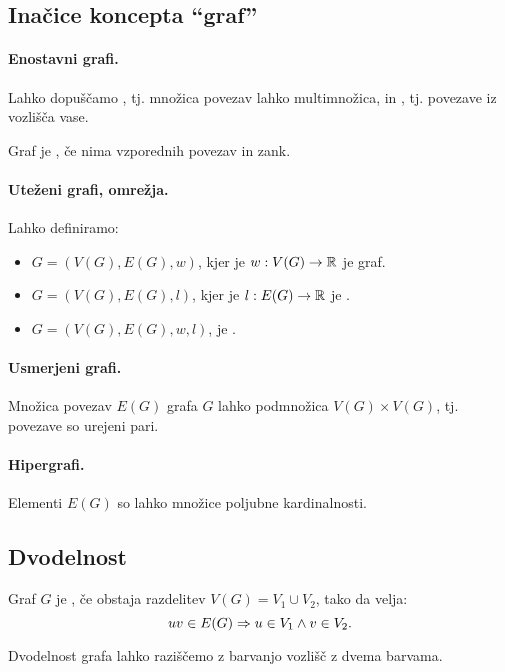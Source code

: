\subsection{Inačice koncepta "`graf"'}
\paragraph{Enostavni grafi.} Lahko dopuščamo , tj. množica povezav lahko multimnožica, in , tj. povezave iz vozlišča vase.
\begin{definicija}
    Graf je , če nima vzporednih povezav in zank.
\end{definicija}

\paragraph{Uteženi grafi, omrežja.} Lahko definiramo:
\begin{itemize}
    \item $G = (V(G), E(G), w)$, kjer je $w: V(G) \to \mathbb{R}$ je  graf.
    \item $G = (V(G), E(G), l)$, kjer je $l: E(G) \to \mathbb{R}$ je .
    \item $G = (V(G), E(G), w, l)$, je . 
\end{itemize}

\paragraph{Usmerjeni grafi.} Množica povezav $E(G)$ grafa $G$ lahko podmnožica $V(G) \times V(G)$, tj. povezave so urejeni pari.

\paragraph{Hipergrafi.} Elementi $E(G)$ so lahko množice poljubne kardinalnosti.

\subsection{Dvodelnost}
\begin{definicija}
    Graf $G$ je , če obstaja razdelitev $V(G) = V_1 \cup V_2$, tako da velja: $$uv \in E(G) \Rightarrow u \in V_1 \land v \in V_2.$$
\end{definicija}

\begin{opomba}
    Dvodelnost grafa lahko raziščemo z barvanjo vozlišč z dvema barvama.
\end{opomba}

